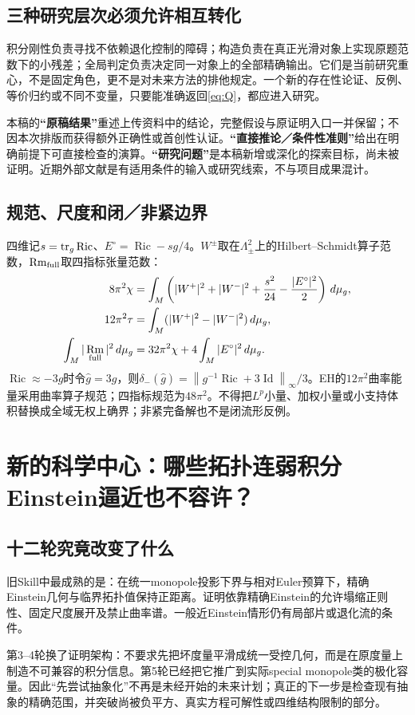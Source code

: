 \documentclass[UTF8,fontset=fandol,zihao=-4]{ctexart}
\DeclareMathOperator{\Ric}{Ric}\DeclareMathOperator{\Rm}{Rm}
\DeclareMathOperator{\Id}{Id}\DeclareMathOperator{\Hess}{Hess}
\newcommand{\dd}{\,d\mu_g}\newcommand{\op}{\mathrm{op}}
\newcommand{\norm}[1]{\left\|#1\right\|}
\theoremstyle{cn}
\begin{document}
\subsection{三种研究层次必须允许相互转化}
积分刚性负责寻找不依赖退化控制的障碍；构造负责在真正光滑对象上实现原题范数下的小残差；全局判定负责决定同一对象上的全部精确输出。它们是当前研究重心，不是固定角色，更不是对未来方法的排他规定。一个新的存在性论证、反例、等价归约或不同不变量，只要能准确返回\eqref{eq:Q}，都应进入研究。

本稿的\textbf{“原稿结果”}重述上传资料中的结论，完整假设与原证明入口一并保留；不因本次排版而获得额外正确性或首创性认证。\textbf{“直接推论／条件性准则”}给出在明确前提下可直接检查的演算。\textbf{“研究问题”}是本稿新增或深化的探索目标，尚未被证明。近期外部文献是有适用条件的输入或研究线索，不与项目成果混计。

\subsection{规范、尺度和闭／非紧边界}
四维记$s=\tr_g\Ric$、$E^\circ=\Ric-sg/4$。$W^\pm$取在$\Lambda^2_\pm$上的Hilbert--Schmidt算子范数，$\Rm_{\rm full}$取四指标张量范数：
\begin{align}
8\pi^2\chi&=\int_M\left(|W^+|^2+|W^-|^2+\frac{s^2}{24}-\frac{|E^\circ|^2}{2}\right)\dd,\label{eq:CGB}\\
12\pi^2\tau&=\int_M(|W^+|^2-|W^-|^2)\dd,\\
\int_M|\Rm_{\rm full}|^2\dd&=32\pi^2\chi+4\int_M|E^\circ|^2\dd.\label{eq:fullenergy}
\end{align}
$\Ric\approx-3g$时令$\widehat g=3g$，则$\delta_-(\widehat g)=\norm{g^{-1}\Ric+3\Id}_\infty/3$。EH的$12\pi^2$曲率能量采用曲率算子规范；四指标规范为$48\pi^2$。不得把$L^p$小量、加权小量或小支持体积替换成全域无权上确界；非紧完备解也不是闭流形反例。

\section{新的科学中心：哪些拓扑连弱积分Einstein逼近也不容许？}
\subsection{十二轮究竟改变了什么}
旧Skill中最成熟的是：在统一monopole投影下界与相对Euler预算下，精确Einstein几何与临界拓扑值保持正距离。证明依靠精确Einstein的允许塌缩正则性、固定尺度展开及禁止曲率谱。一般近Einstein情形仍有局部片或退化流的条件。

第3--4轮换了证明架构：不要求先把坏度量平滑成统一受控几何，而是在原度量上制造不可兼容的积分信息。第5轮已经把它推广到实际special monopole类的极化容量。因此“先尝试抽象化”不再是未经开始的未来计划；真正的下一步是检查现有抽象的精确范围，并突破尚被负平方、真实方程可解性或四维结构限制的部分。
\end{document}
